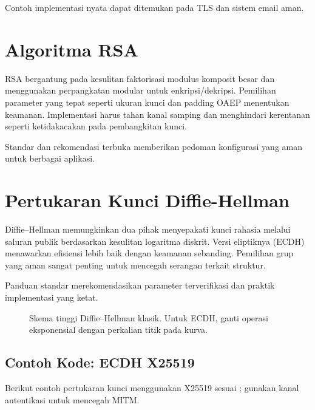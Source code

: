 \documentclass[../main.tex]{subfiles}
\begin{document}
Contoh implementasi nyata dapat ditemukan pada TLS dan sistem email aman.

\section{Algoritma RSA}
RSA bergantung pada kesulitan faktorisasi modulus komposit besar dan menggunakan perpangkatan modular untuk enkripsi/dekripsi. Pemilihan parameter yang tepat seperti ukuran kunci dan padding OAEP menentukan keamanan. Implementasi harus tahan kanal samping dan menghindari kerentanan seperti ketidakacakan pada pembangkitan kunci.

Standar dan rekomendasi terbuka memberikan pedoman konfigurasi yang aman untuk berbagai aplikasi.

\section{Pertukaran Kunci Diffie-Hellman}
Diffie--Hellman memungkinkan dua pihak menyepakati kunci rahasia melalui saluran publik berdasarkan kesulitan logaritma diskrit. Versi eliptiknya (ECDH) menawarkan efisiensi lebih baik dengan keamanan sebanding. Pemilihan grup yang aman sangat penting untuk mencegah serangan terkait struktur.

Panduan standar merekomendasikan parameter terverifikasi dan praktik implementasi yang ketat.

\begin{figure}[h]
\centering
{}
\caption[Skema Diffie--Hellman dan ECDH]{Skema tinggi Diffie--Hellman klasik. Untuk ECDH, ganti operasi eksponensial dengan perkalian titik pada kurva.}
\label{fig:dh}
\end{figure}

\subsection{Contoh Kode: ECDH X25519}
Berikut contoh pertukaran kunci menggunakan X25519 sesuai \textcite{rfc7748}; gunakan kanal autentikasi untuk mencegah MITM.
\end{document}
